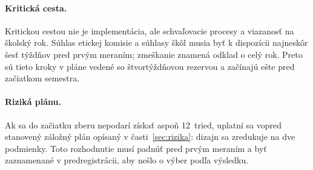 \paragraph{Kritická cesta.} Kritickou cestou nie je implementácia, ale schvaľovacie procesy a viazanosť na školský rok. Súhlas etickej komisie a súhlasy škôl musia byť k dispozícii najneskôr šesť týždňov pred prvým meraním; zmeškanie znamená odklad o celý rok. Preto sú tieto kroky v pláne vedené so štvortýždňovou rezervou a začínajú ešte pred začiatkom semestra.

\paragraph{Riziká plánu.} Ak sa do začiatku zberu nepodarí získať aspoň 12~tried, uplatní sa vopred stanovený záložný plán opísaný v časti~\ref{sec:rizika}: dizajn sa zredukuje na dve podmienky. Toto rozhodnutie musí padnúť pred prvým meraním a byť zaznamenané v predregistrácii, aby nešlo o výber podľa výsledku.
